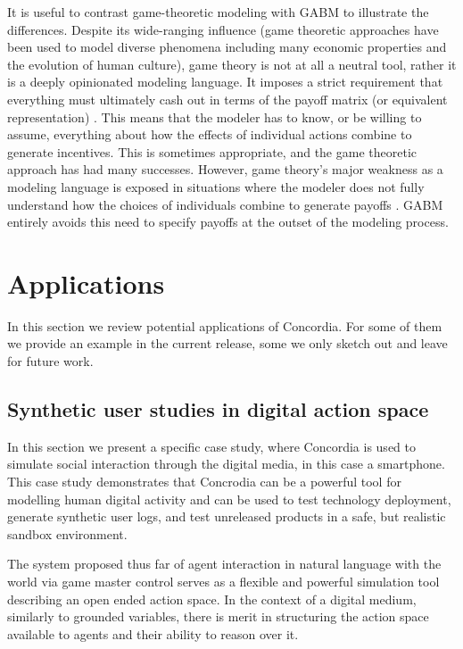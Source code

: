 \documentclass[11pt, a4paper, logo, twocolumn, internal, copyright, numbering]{googledeepmind}
\begin{document}
It is useful to contrast game-theoretic modeling with GABM to illustrate the differences. Despite its wide-ranging influence (game theoretic approaches have been used to model diverse phenomena including many economic properties and the evolution of human culture), game theory is not at all a neutral tool, rather it is a deeply opinionated modeling language. It imposes a strict requirement that everything must ultimately cash out in terms of the payoff matrix (or equivalent representation) \citep{luce1957games}. This means that the modeler has to know, or be willing to assume, everything about how the effects of individual actions combine to generate incentives. This is sometimes appropriate, and the game theoretic approach has had many successes. However, game theory’s major weakness as a modeling language is exposed in situations where the modeler does not fully understand how the choices of individuals combine to generate payoffs \citep{hertz2023beyond}. GABM entirely avoids this need to specify payoffs at the outset of the modeling process.

\section{Applications}
\label{sec:applications}

In this section we review potential applications of Concordia. For some of them we provide an example in the current release, some we only sketch out and leave for future work.

\subsection{Synthetic user studies in digital action space}
In this section we present a specific case study, where Concordia is used to simulate social interaction through the digital media, in this case a smartphone. This case study demonstrates that Concrodia can be a powerful tool for modelling human digital activity and can be used to test technology deployment, generate synthetic user logs, and test unreleased products in a safe, but realistic sandbox environment.

The system proposed thus far of agent interaction in natural language with the world via game master control serves as a flexible and powerful simulation tool describing an open ended action space. In the context of a digital medium, similarly to grounded variables, there is merit in structuring the action space available to agents and their ability to reason over it.
\end{document}
